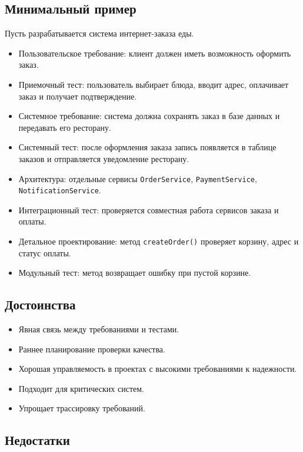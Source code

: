 \documentclass[12pt,a4paper]{article}
\begin{document}
\subsection{Минимальный пример}

Пусть разрабатывается система интернет-заказа еды.

\begin{itemize}
    \item Пользовательское требование: клиент должен иметь возможность оформить заказ.
    \item Приемочный тест: пользователь выбирает блюда, вводит адрес, оплачивает заказ и получает подтверждение.
    \item Системное требование: система должна сохранять заказ в базе данных и передавать его ресторану.
    \item Системный тест: после оформления заказа запись появляется в таблице заказов и отправляется уведомление ресторану.
    \item Архитектура: отдельные сервисы \texttt{OrderService}, \texttt{PaymentService}, \texttt{NotificationService}.
    \item Интеграционный тест: проверяется совместная работа сервисов заказа и оплаты.
    \item Детальное проектирование: метод \texttt{createOrder()} проверяет корзину, адрес и статус оплаты.
    \item Модульный тест: метод возвращает ошибку при пустой корзине.
\end{itemize}

\subsection{Достоинства}

\begin{itemize}
    \item Явная связь между требованиями и тестами.
    \item Раннее планирование проверки качества.
    \item Хорошая управляемость в проектах с высокими требованиями к надежности.
    \item Подходит для критических систем.
    \item Упрощает трассировку требований.
\end{itemize}

\subsection{Недостатки}
\end{document}
